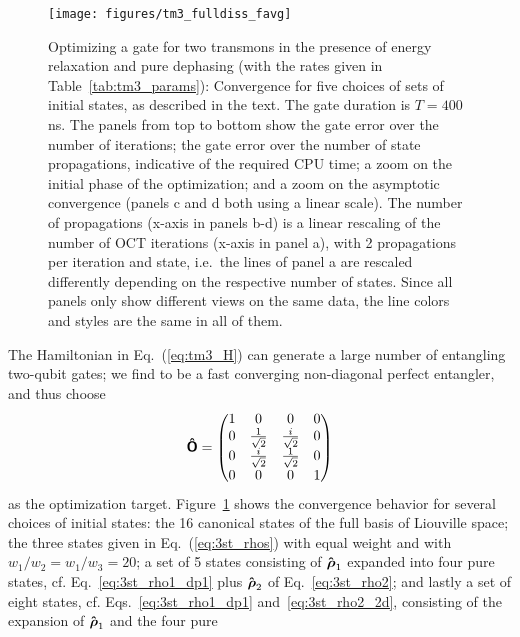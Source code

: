 \begin{figure}[tb] %
  \centering
 \texttt{[image: figures/tm3\_fulldiss\_favg]}
 \caption{Optimizing a \sqrtISWAP{} gate for two transmons in the
   presence of energy relaxation and pure dephasing (with the rates
   given in Table~\ref{tab:tm3_params}): Convergence
   for five choices of sets of initial states, as described in the text. The gate
   duration is $T = 400\,$ns. The panels from top to bottom show the
   gate error over the number of iterations; the
   gate error over the number of state propagations, indicative of the required
   CPU time; a zoom on the initial phase of the optimization; and a zoom on the
   asymptotic convergence (panels c and d both using a linear scale). The number
   of propagations (x-axis in panels b-d) is a linear rescaling of the number of
   OCT iterations (x-axis in panel a), with 2 propagations per iteration and
   state, i.e.\ the lines of panel a are rescaled differently depending
   on the respective number of states. Since all panels only show different
   views on the same data, the line colors and styles are the same in all of
   them.}
 \label{fig:tm3_fulldiss_favg}
\end{figure}
The Hamiltonian in Eq.~(\ref{eq:tm3_H}) can generate a large number of
entangling two-qubit gates; we find \sqrtISWAP{} to be a fast converging
non-diagonal perfect entangler, and thus choose
\begin{equation}
  \Op{O}%
  = \begin{pmatrix}
    1 &                  0 &                  0 & 0 \\
    0 & \frac{1}{\sqrt{2}} & \frac{i}{\sqrt{2}} & 0 \\
    0 & \frac{i}{\sqrt{2}} & \frac{1}{\sqrt{2}} & 0 \\
    0 &                  0 &                  0 & 1
  \end{pmatrix}
  \label{eq:sqrt_iswap}
\end{equation}
as the optimization target.
Figure~\ref{fig:tm3_fulldiss_favg} shows the convergence behavior for
several choices of initial states: the 16 canonical states of the full
basis of Liouville space; the three states given in
Eq.~(\ref{eq:3st_rhos}) with equal weight and
with $w_1 / w_2 = w_1 / w_3 = 20$; a set of 5 states consisting of $\boldsymbol{\mathsf{\hat{\rho}}}_1$
expanded into four pure states, cf. Eq.~\eqref{eq:3st_rho1_dp1}
plus $\boldsymbol{\mathsf{\hat{\rho}}}_2$ of Eq.~\eqref{eq:3st_rho2}; and lastly a set of eight
states, cf. Eqs.~\eqref{eq:3st_rho1_dp1}
and~\eqref{eq:3st_rho2_2d},
consisting of the expansion of $\boldsymbol{\mathsf{\hat{\rho}}}_1$ and the four pure
